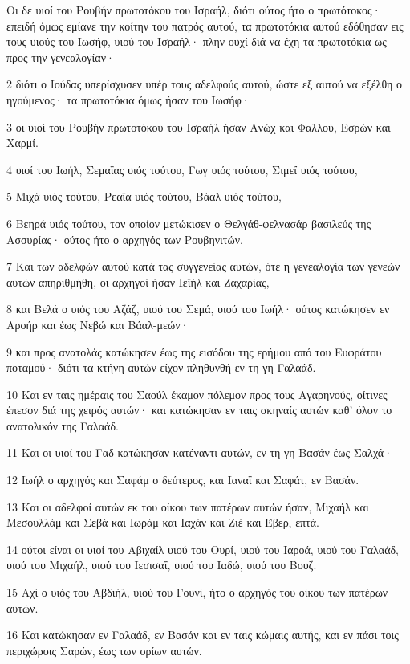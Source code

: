 \par Οι δε υιοί του Ρουβήν πρωτοτόκου του Ισραήλ, διότι ούτος ήτο ο πρωτότοκος· επειδή όμως εμίανε την κοίτην του πατρός αυτού, τα πρωτοτόκια αυτού εδόθησαν εις τους υιούς του Ιωσήφ, υιού του Ισραήλ· πλην ουχί διά να έχη τα πρωτοτόκια ως προς την γενεαλογίαν·
\par 2 διότι ο Ιούδας υπερίσχυσεν υπέρ τους αδελφούς αυτού, ώστε εξ αυτού να εξέλθη ο ηγούμενος· τα πρωτοτόκια όμως ήσαν του Ιωσήφ·
\par 3 οι υιοί του Ρουβήν πρωτοτόκου του Ισραήλ ήσαν Ανώχ και Φαλλού, Εσρών και Χαρμί.
\par 4 υιοί του Ιωήλ, Σεμαΐας υιός τούτου, Γωγ υιός τούτου, Σιμεΐ υιός τούτου,
\par 5 Μιχά υιός τούτου, Ρεαΐα υιός τούτου, Βάαλ υιός τούτου,
\par 6 Βεηρά υιός τούτου, τον οποίον μετώκισεν ο Θελγάθ-φελνασάρ βασιλεύς της Ασσυρίας· ούτος ήτο ο αρχηγός των Ρουβηνιτών.
\par 7 Και των αδελφών αυτού κατά τας συγγενείας αυτών, ότε η γενεαλογία των γενεών αυτών απηριθμήθη, οι αρχηγοί ήσαν Ιεϊήλ και Ζαχαρίας,
\par 8 και Βελά ο υιός του Αζάζ, υιού του Σεμά, υιού του Ιωήλ· ούτος κατώκησεν εν Αροήρ και έως Νεβώ και Βάαλ-μεών·
\par 9 και προς ανατολάς κατώκησεν έως της εισόδου της ερήμου από του Ευφράτου ποταμού· διότι τα κτήνη αυτών είχον πληθυνθή εν τη γη Γαλαάδ.
\par 10 Και εν ταις ημέραις του Σαούλ έκαμον πόλεμον προς τους Αγαρηνούς, οίτινες έπεσον διά της χειρός αυτών· και κατώκησαν εν ταις σκηναίς αυτών καθ' όλον το ανατολικόν της Γαλαάδ.
\par 11 Και οι υιοί του Γαδ κατώκησαν κατέναντι αυτών, εν τη γη Βασάν έως Σαλχά·
\par 12 Ιωήλ ο αρχηγός και Σαφάμ ο δεύτερος, και Ιαναΐ και Σαφάτ, εν Βασάν.
\par 13 Και οι αδελφοί αυτών εκ του οίκου των πατέρων αυτών ήσαν, Μιχαήλ και Μεσουλλάμ και Σεβά και Ιωράμ και Ιαχάν και Ζιέ και Έβερ, επτά.
\par 14 ούτοι είναι οι υιοί του Αβιχαίλ υιού του Ουρί, υιού του Ιαροά, υιού του Γαλαάδ, υιού του Μιχαήλ, υιού του Ιεσισαΐ, υιού του Ιαδώ, υιού του Βουζ.
\par 15 Αχί ο υιός του Αβδιήλ, υιού του Γουνί, ήτο ο αρχηγός του οίκου των πατέρων αυτών.
\par 16 Και κατώκησαν εν Γαλαάδ, εν Βασάν και εν ταις κώμαις αυτής, και εν πάσι τοις περιχώροις Σαρών, έως των ορίων αυτών.
